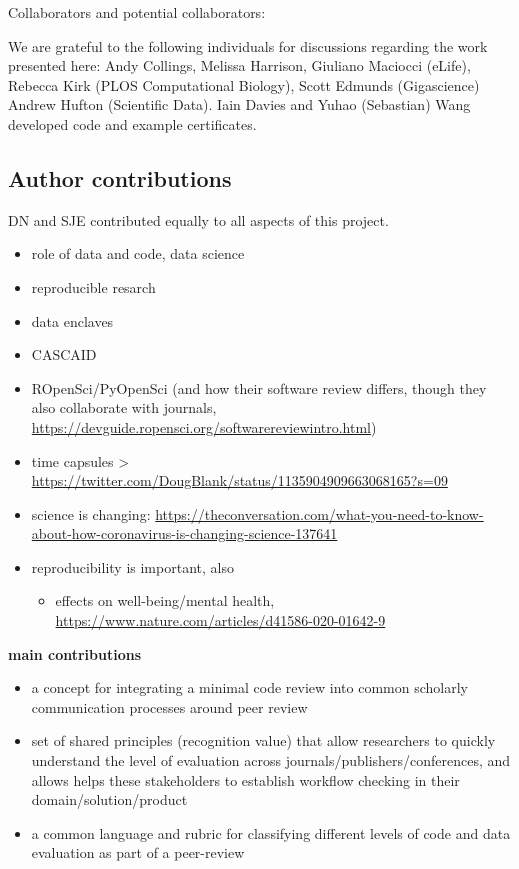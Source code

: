 \documentclass[12pt]{article}
\begin{document}
Collaborators and potential collaborators:

We are grateful to the following individuals for discussions regarding
the work presented here: Andy Collings, Melissa Harrison, Giuliano
Maciocci (eLife), Rebecca Kirk (PLOS Computational Biology), Scott
Edmunds (Gigascience) Andrew Hufton (Scientific Data). Iain Davies and
Yuhao (Sebastian) Wang developed code and example certificates.

\subsection*{Author contributions}

DN and SJE contributed equally to all aspects of this project.


{\small
}





\clearpage
\begin{itemize}
\item
  role of data and code, data science
\item
  reproducible resarch
\item
  data enclaves
\item
  CASCAID
\item
  ROpenSci/PyOpenSci (and how their software review differs, though they
  also collaborate with journals,
  \url{https://devguide.ropensci.org/softwarereviewintro.html})
\item
  time capsules \textgreater{}
  \url{https://twitter.com/DougBlank/status/1135904909663068165?s=09}
\item
  science is changing:
  \url{https://theconversation.com/what-you-need-to-know-about-how-coronavirus-is-changing-science-137641}
\item
  reproducibility is important, also

  \begin{itemize}
  \item
    effects on well-being/mental health,
    \url{https://www.nature.com/articles/d41586-020-01642-9}
  \end{itemize}
\end{itemize}

\textbf{main contributions}

\begin{itemize}
\item
  a concept for integrating a minimal code review into common scholarly
  communication processes around peer review
\item
  set of shared principles (recognition value) that allow researchers to
  quickly understand the level of evaluation across
  journals/publishers/conferences, and allows helps these stakeholders
  to establish workflow checking in their domain/solution/product
\item
  a common language and rubric for classifying different levels of code
  and data evaluation as part of a peer-review
\end{itemize}
\end{document}
